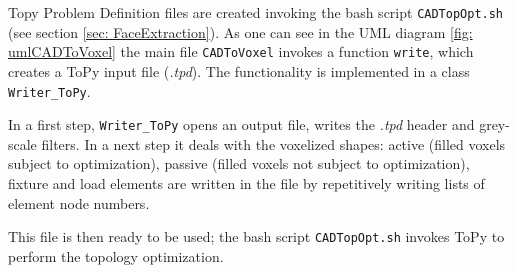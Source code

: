 Topy Problem Definition files are created invoking the bash script \lstinline|CADTopOpt.sh| (see section \ref{sec: FaceExtraction}). As one can see in the UML diagram \ref{fig: umlCADToVoxel} the main file \lstinline|CADToVoxel| invokes a function \lstinline|write|, which creates a ToPy input file ({\it.tpd}). The functionality is implemented in a class \lstinline|Writer_ToPy|.

In a first step, \lstinline|Writer_ToPy| opens an output file, writes the {\it.tpd} header and grey-scale filters. In a next step it deals with the voxelized shapes: active (filled voxels subject to optimization), passive (filled voxels not subject to optimization), fixture and load elements are written in the file by repetitively writing lists of element node numbers.   

This file is then ready to be used; the bash script \lstinline|CADTopOpt.sh| invokes ToPy to perform the topology optimization. 